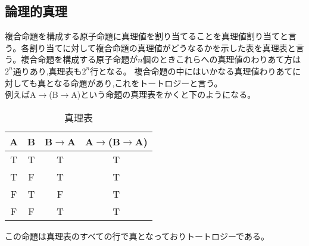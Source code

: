 \documentclass[10pt,b5paper,papersize,dvipdfmx]{jsbook}
\begin{document}
\subsection{論理的真理}
複合命題を構成する原子命題に真理値を割り当てることを真理値割り当てと言う。各割り当てに対して複合命題の真理値がどうなるかを示した表を真理表と言う。複合命題を構成する原子命題が$n$個のときこれらへの真理値のわりあて方は$2^n$通りあり,真理表も$2^n$行となる。
複合命題の中にはいかなる真理値わりあてに対しても真となる命題があり,これをトートロジーと言う。\\
例えばA$\to$(B$\to$A)という命題の真理表をかくと下のようになる。\\
\begin{table}[H]
\begin{center}
\caption{真理表}
\begin{tabular}{|c|c||c|c|}\hline
A&B&B$\to$A&A$\to$(B$\to$A) \\ \hline \hline
T&T&T&T \\ \hline
T&F&T&T \\ \hline
F&T&F&T \\ \hline
F&F&T&T \\ \hline
\end{tabular}
\end{center}
\end{table}
この命題は真理表のすべての行で真となっておりトートロジーである。
\end{document}
